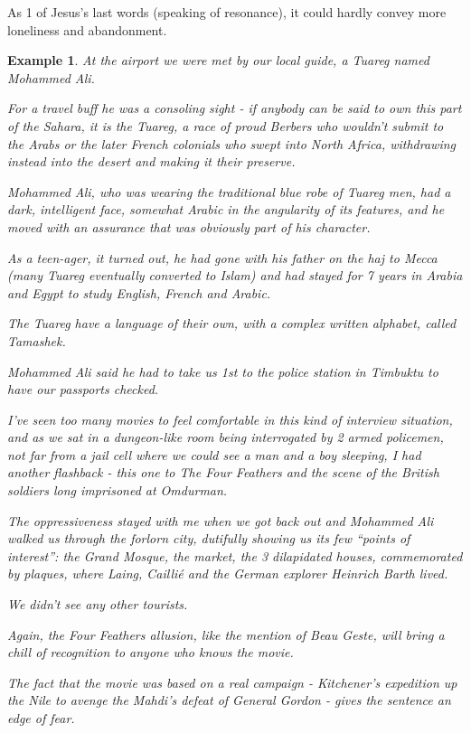 \documentclass{book}
\numberwithin{equation}{section}
\newtheorem{example}{Example}[chapter]
\begin{document}
As 1 of Jesus's last words (speaking of resonance), it could hardly convey more loneliness and abandonment.
\begin{example}
    At the airport we were met by our local guide, a Tuareg named Mohammed Ali.
    
    For a travel buff he was a consoling sight - if anybody can be said to own this part of the Sahara, it is the Tuareg, a race of proud Berbers who wouldn't submit to the Arabs or the later French colonials who swept into North Africa, withdrawing instead into the desert and making it their preserve.
    
    Mohammed Ali, who was wearing the traditional blue robe of Tuareg men, had a dark, intelligent face, somewhat Arabic in the angularity of its features, and he moved with an assurance that was obviously part of his character.
    
    As a teen-ager, it turned out, he had gone with his father on the \emph{haj} to Mecca (many Tuareg eventually converted to Islam) and had stayed for 7 years in Arabia and Egypt to study English, French and Arabic.
    
    The Tuareg have a language of their own, with a complex written alphabet, called Tamashek.
    
    Mohammed Ali said he had to take us 1st to the police station in Timbuktu to have our passports checked.
    
    I've seen too many movies to feel comfortable in this kind of interview situation, and as we sat in a dungeon-like room being interrogated by 2 armed policemen, not far from a jail cell where we could see a man and a boy sleeping, I had another flashback - this one to \emph{The Four Feathers} and the scene of the British soldiers long imprisoned at Omdurman.
    
    The oppressiveness stayed with me when we got back out and Mohammed Ali walked us through the forlorn city, dutifully showing us its few ``points of interest'': the Grand Mosque, the market, the 3 dilapidated houses, commemorated by plaques, where Laing, Cailli\'e and the German explorer Heinrich Barth lived.
    
    We didn't see any other tourists.
    
    Again, the \emph{Four Feathers} allusion, like the mention of \emph{Beau Geste}, will bring a chill of recognition to anyone who knows the movie.
    
    The fact that the movie was based on a real campaign - Kitchener's expedition up the Nile to avenge the Mahdi's defeat of General Gordon - gives the sentence an edge of fear.
    

\end{example}
\end{document}
